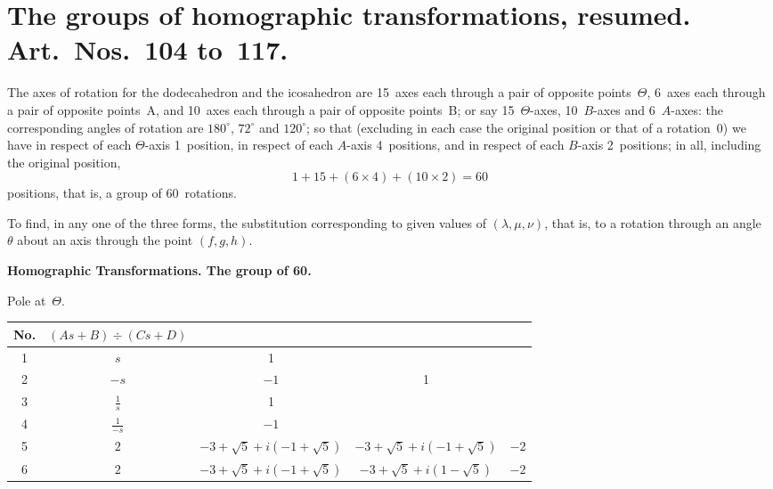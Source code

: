 \documentclass[11pt,a4paper]{book}
\begin{document}
\section*{The groups of homographic transformations, resumed.
Art.~Nos.~104 to~117.}

\begin{art}
The axes of rotation for the dodecahedron and the icosahedron are 15~axes
each through a pair of opposite points~$\Theta$, 6~axes each through a pair
of opposite points~A, and 10~axes each through a pair of opposite
points~B; or say 15~$\Theta$-axes, 10~$B$-axes and 6~$A$-axes: the corresponding
angles of rotation are $180^\circ$, $72^\circ$ and $120^\circ$; so that (excluding in
each case the original position or that of a rotation~0) we have in respect
of each $\Theta$-axis 1~position, in respect of each $A$-axis 4~positions, and in
respect of each $B$-axis 2~positions; in all, including the original position,
\[
1 + 15 + (6 \times 4) + (10 \times 2) = 60
\]
positions, that is, a group of 60~rotations.
\end{art}

\begin{art}
To find, in any one of the three forms, the substitution corresponding to
given values of $(\lambda, \mu, \nu)$, that is, to a rotation through an angle~$\theta$
about an axis through the point $(f, g, h)$.
\end{art}

\begin{art}
\textbf{Homographic Transformations. The group of 60.}

Pole at~$\Theta$.

\begin{center}
\begin{longtable}{|c|c|c|c|c|}
\hline
No. & $(As+B) \div (Cs+D)$ & & & \\
\hline
1 & $s$ & 1 & & \\
2 & $-s$ & $-1$ & 1 & \\
3 & $\frac{1}{s}$ & 1 & & \\
4 & $\frac{1}{-s}$ & $-1$ & & \\
5 & $2$ & $-3+\sqrt{5}+i(-1+\sqrt{5})$ & $-3+\sqrt{5}+i(-1+\sqrt{5})$ & $-2$ \\
6 & $2$ & $-3+\sqrt{5}+i(-1+\sqrt{5})$ & $-3+\sqrt{5}+i(1-\sqrt{5})$ & $-2$ \\
\hline
\end{longtable}
\end{center}
\end{art}
\end{document}
